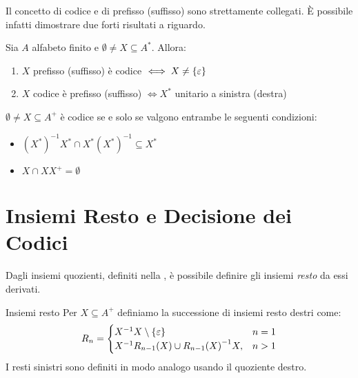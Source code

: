 Il concetto di codice e di prefisso (suffisso) sono strettamente collegati.
È possibile infatti dimostrare due forti risultati a riguardo.
\begin{theorem}[label=thm:prefix_suffix_code]{}
  Sia \(A\) alfabeto finito e \(\emptyset \neq X \subseteq A^*\).
  Allora:
  \begin{enumerate}
    \item \(X\) prefisso (suffisso) è codice \(\iff X \neq \set{\varepsilon}\)
    \item \(X\) codice è prefisso (suffisso) \(\iff X^*\) unitario a sinistra (destra)
  \end{enumerate}
\end{theorem}

\begin{corollary}{}
  \(\emptyset \neq X \subseteq A^+\) è codice se e solo se valgono entrambe le seguenti condizioni:
  \begin{itemize}
    \item \({(X^*)}^{-1}X^* \cap X^*{(X^*)}^{-1} \subseteq X^* \)
    \item \(X \cap XX^+ = \emptyset\)
  \end{itemize}
\end{corollary}

\section{Insiemi Resto e Decisione dei Codici}

Dagli insiemi quozienti, definiti nella , è possibile definire gli insiemi \emph{resto} da essi derivati.
\begin{definition}{Insiemi resto}
  Per \(X \subseteq A^+\) definiamo la successione di insiemi resto destri come:
  \begin{equation}
    R_n=\begin{cases}
      X^{-1}X\setminus \set{\varepsilon} & n = 1\\
      X^{-1} R_{n-1}(X) \cup {R_{n-1}(X)}^{-1}X, & n > 1\\
    \end{cases}
  \end{equation}
  I resti sinistri sono definiti in modo analogo usando il quoziente destro.
\end{definition}

